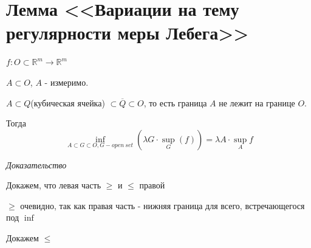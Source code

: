 \documentclass[paper=a4, fontsize=17pt]{article}
\begin{document}
\section{Лемма <<Вариации на тему регулярности меры Лебега>>}
$f: O \subset \mathds{R}^m \rightarrow \mathds{R}^m$

$A \subset O$, $A$ - измеримо.

$A \subset Q$(кубическая ячейка) $\subset \overline Q \subset O$, то есть граница $A$ не лежит на границе $O$.

Тогда $$\inf_{A \subset G \subset O, G - open ~ set} (\lambda G \cdot \sup_G(f)) = \lambda A \cdot \sup_A f$$

\emph{Доказательство}

Докажем, что левая часть $\geqslant$ и $\leqslant$ правой

$\geqslant$ очевидно, так как правая часть - нижняя граница для всего, встречающегося под $\inf$

Докажем $\leqslant$
\end{document}
